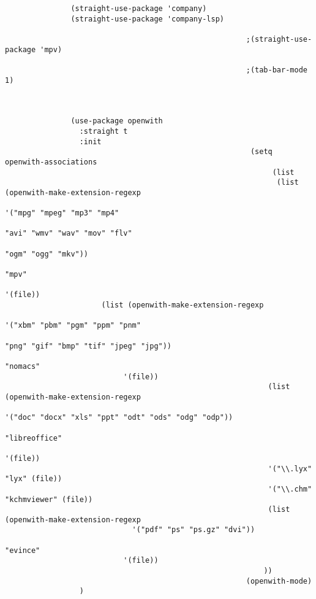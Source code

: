 \documentclass[11pt]{article}
\begin{document}
\begin{verbatim}
               (straight-use-package 'company)
               (straight-use-package 'company-lsp)

                                                       ;(straight-use-package 'mpv)

                                                       ;(tab-bar-mode 1)



               (use-package openwith
                 :straight t
                 :init
                                                        (setq openwith-associations
                                                             (list
                                                              (list (openwith-make-extension-regexp
                                                                    '("mpg" "mpeg" "mp3" "mp4"
                                                                      "avi" "wmv" "wav" "mov" "flv"
                                                                      "ogm" "ogg" "mkv"))
                                                                   "mpv"
                                                                   '(file))
                      (list (openwith-make-extension-regexp
                                                                   '("xbm" "pbm" "pgm" "ppm" "pnm"
                                                                     "png" "gif" "bmp" "tif" "jpeg" "jpg"))
                                                                  "nomacs"
                           '(file))
                                                            (list (openwith-make-extension-regexp
                                                                   '("doc" "docx" "xls" "ppt" "odt" "ods" "odg" "odp"))
                                                                  "libreoffice"
                                                                  '(file))
                                                            '("\\.lyx" "lyx" (file))
                                                            '("\\.chm" "kchmviewer" (file))
                                                            (list (openwith-make-extension-regexp
                             '("pdf" "ps" "ps.gz" "dvi"))
                                                                  "evince"
                           '(file))
                                                           ))
                                                       (openwith-mode)
                 )





\end{verbatim}
\end{document}
